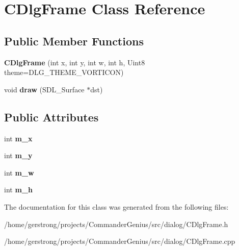 \hypertarget{class_c_dlg_frame}{
\section{CDlgFrame Class Reference}
\label{class_c_dlg_frame}
}
\subsection*{Public Member Functions}
\begin{DoxyCompactItemize}
\item 
\hypertarget{class_c_dlg_frame_a033ff686ae31c73767850635c358061e}{
{\bfseries CDlgFrame} (int x, int y, int w, int h, Uint8 theme=DLG\_\-THEME\_\-VORTICON)}
\label{class_c_dlg_frame_a033ff686ae31c73767850635c358061e}

\item 
\hypertarget{class_c_dlg_frame_a98a8b369f00b3eba103cc183572f3e32}{
void {\bfseries draw} (SDL\_\-Surface $\ast$dst)}
\label{class_c_dlg_frame_a98a8b369f00b3eba103cc183572f3e32}

\end{DoxyCompactItemize}
\subsection*{Public Attributes}
\begin{DoxyCompactItemize}
\item 
\hypertarget{class_c_dlg_frame_a35f6d8a060241050a984f1573d343899}{
int {\bfseries m\_\-x}}
\label{class_c_dlg_frame_a35f6d8a060241050a984f1573d343899}

\item 
\hypertarget{class_c_dlg_frame_aae45b12bb63449a2733f72b5afad4e53}{
int {\bfseries m\_\-y}}
\label{class_c_dlg_frame_aae45b12bb63449a2733f72b5afad4e53}

\item 
\hypertarget{class_c_dlg_frame_a643f865cb84fb00b05763c62ec028860}{
int {\bfseries m\_\-w}}
\label{class_c_dlg_frame_a643f865cb84fb00b05763c62ec028860}

\item 
\hypertarget{class_c_dlg_frame_af7fa8aa22f783397360ddbb54ee2bca8}{
int {\bfseries m\_\-h}}
\label{class_c_dlg_frame_af7fa8aa22f783397360ddbb54ee2bca8}

\end{DoxyCompactItemize}


The documentation for this class was generated from the following files:\begin{DoxyCompactItemize}
\item 
/home/gerstrong/projects/CommanderGenius/src/dialog/CDlgFrame.h\item 
/home/gerstrong/projects/CommanderGenius/src/dialog/CDlgFrame.cpp\end{DoxyCompactItemize}
